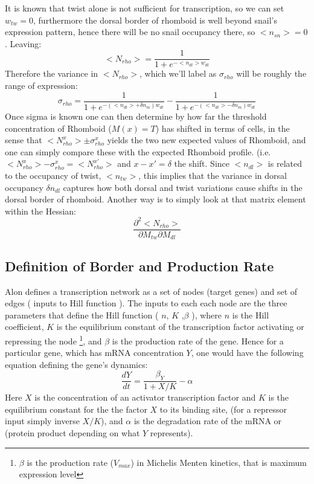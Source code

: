 It is known that twist alone is not sufficient for transcription, so we can set $w_{tw} = 0$, furthermore the dorsal border of rhomboid is well beyond snail's expression pattern, hence there will be no snail occupancy there, so $<n_{sn}>=0$.  Leaving:
\begin{equation}\label{}
    <N_{rho} > = \frac{1}{1+e^{-<n_{dl}>w_{dl} }}
\end{equation}
Therefore the variance in $<N_{rho} >$, which we'll label as $\sigma_{rho}$ will be roughly the range of expression:
\begin{equation}\label{}
 \sigma_{rho}  = \frac{1}{1+e^{-(<n_{dl}> +\delta n_m ) w_{dl} }} - \frac{1}{1+e^{-(<n_{dl}> -\delta n_m ) w_{dl} }}
\end{equation}
Once sigma is known one can then determine by how far the threshold concentration of Rhomboid ($M(x) = T$) has shifted in terms of cells, in the sense that $<N_{rho}^x > \pm \sigma_{rho}^x$ yields the two new expected values of Rhomboid, and one can simply compare these with the expected Rhomboid profile. (i.e.  $ <N_{rho}^x >- \sigma_{rho}^x  = <N_{rho}^{x'} >$  and $x-x' = \delta$ the shift.  Since $<n_{dl}>$ is related to the occupancy of twist, $<n_{tw}>$, this implies that the variance in dorsal occupancy $\delta n_{dl}$ captures how both dorsal and twist variations cause shifts in the dorsal border of rhomboid.  Another way is to simply look at that matrix element within the Hessian:
\begin{equation}\label{}
    \frac{\partial^2 <N_{rho}>}{\partial M_{tw} \partial M_{dl}}
\end{equation}
\subsection{Definition of Border and Production Rate}

Alon defines a transcription network as a set of nodes (target genes) and set of edges ( inputs to Hill function ).  The inputs to each each node are the three parameters that define the Hill function ( $n$, $K$ ,$\beta$ ), where $n$ is the Hill coefficient, $K$ is the equilibrium constant of the transcription factor activating or repressing the node \footnote[1]{ $\beta$ is the production rate ($V_{max}$) in Michelis Menten kinetics, that is maximum expression level}, and $\beta$ is the production rate of the gene.  Hence for a particular gene, which has mRNA concentration $Y$, one would have the following equation defining the gene's dynamics:
  \begin{equation}\label{}
    \frac{d Y}{d t} = \frac{\beta_{Y} }{ 1 + X/K} - \alpha
  \end{equation}
  Here $X$ is the concentration of an activator transcription factor and $K$ is the equilibrium constant for the the factor $X$ to its binding site, (for a repressor input simply inverse $X/K$), and $\alpha$ is the degradation rate of the mRNA or (protein product depending on what $Y$ represents).

